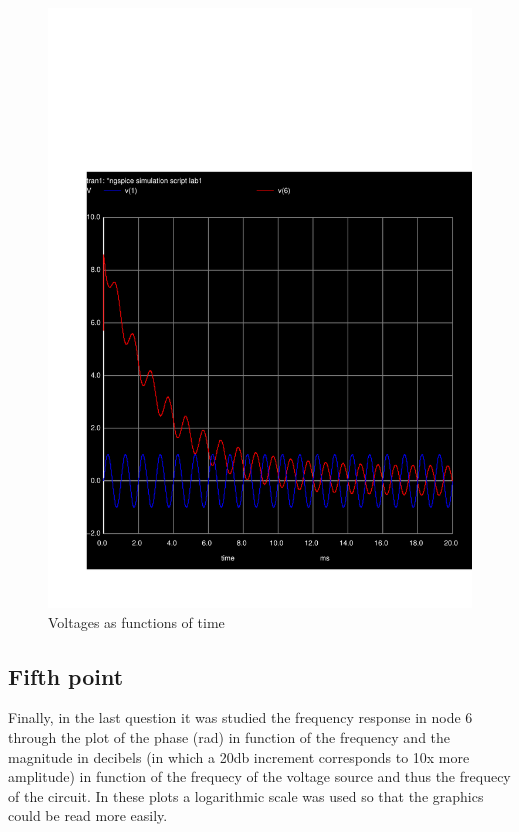 \begin{figure}[h] \centering
\includegraphics[width=0.6\linewidth]{teste_4.pdf}
\caption{Voltages as functions of time}
\label{fig:V(t)}
\end{figure}

\subsection{Fifth point}
\label{ssec:5S}

\par Finally, in the last question it was studied the frequency response in node 6 through the plot of the phase (rad) in function of the frequency and the magnitude in decibels (in which a 20db increment corresponds to 10x more amplitude) in function of the frequecy of the voltage source and thus the frequecy of the circuit. In these plots a logarithmic scale was used so that the graphics could be read more easily. 

